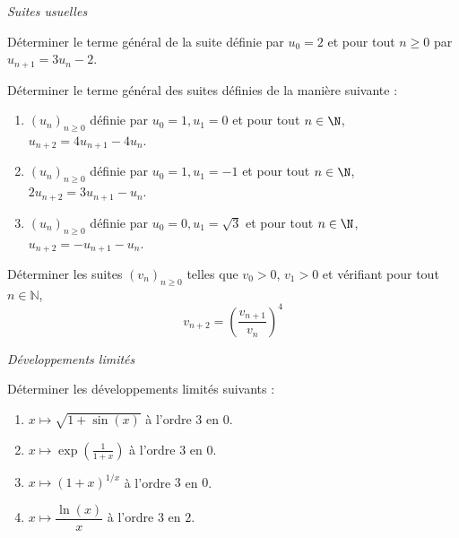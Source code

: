 \documentclass[a4paper,10pt]{report}
\begin{document}
\medskip

\begin{center}
\textit{{ {\large Suites usuelles}}}
\end{center}

\medskip


\begin{Exa} Déterminer le terme général de la suite définie par $u_0=2$ et pour tout $n \geq 0$ par $u_{n+1}=3u_n-2$.
\end{Exa} 



\begin{Exa} Déterminer le terme général des suites définies de la manière suivante :
    \begin{enumerate}
      \item
        $(u_n)_{n \geq 0}$ définie par $u_0 = 1,u_1 = 0$ et pour tout $n \in \N$, $u_{n + 2} = 4u_{n + 1} - 4u_n$.
      \item
        $(u_n)_{n \geq 0}$ définie par $u_0 = 1,u_1 = - 1$ et pour tout $n \in \N$, $2u_{n + 2} = 3u_{n + 1} - u_n$.
        \item
        $(u_n)_{n \geq 0}$ définie par $u_0 = 0,u_1 = \sqrt{3}$ et pour tout $n \in \N$, $u_{n + 2} = -u_{n+1}- u_n$.

    \end{enumerate}
\end{Exa}    


\begin{Exa} Déterminer les suites $(v_n)_{n \geq 0}$ telles que $v_0>0$, $v_1>0$  et vérifiant pour tout $n \in \mathbb{N}$, 
$$v_{n+2}=\left(\dfrac{v_{n+1}}{v_n}\right)^4$$
\end{Exa}


\newpage


\begin{center}
\textit{{ {\large Développements limités}}}
\end{center}

\medskip



\begin{Exa}
Déterminer les développements limités suivants :

\begin{multicols}{2}
\begin{enumerate}
\item $x \mapsto \sqrt{1+\sin(x)}$ à l'ordre $3$ en $0$.
\item $x \mapsto \exp \left( \frac{1}{1+x}\right)$ à l'ordre $3$ en $0$.
\item $x \mapsto (1+x)^{1/x}$ à l'ordre $3$ en $0$.
\item $x \mapsto \dfrac{\ln(x)}{x}$ à l'ordre $3$ en $2$.
\end{enumerate}
\end{multicols}

\vspace{0.1cm}
\end{Exa} 
 
\end{document}
